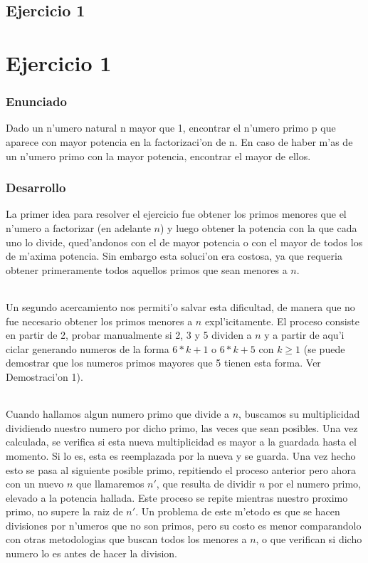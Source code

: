 \chapter{Ejercicio 1}
\part{Ejercicio 1}
\section{Enunciado}
Dado un n'umero natural n mayor que 1, encontrar el n'umero primo p que aparece con mayor potencia en la factorizaci'on de n. En caso de haber m'as de un n'umero primo con  la mayor potencia, encontrar el mayor de ellos.

\section{Desarrollo}
La primer idea para resolver el ejercicio fue obtener los primos menores que el n'umero a factorizar
(en adelante $n$) y luego obtener la potencia con la que cada uno lo divide, qued'andonos con el de mayor
potencia o con el mayor de todos los de m'axima potencia. Sin embargo esta soluci'on era costosa, ya que requeria obtener primeramente todos aquellos primos que sean menores a $n$.
\paragraph{}
Un segundo acercamiento nos permiti'o salvar esta dificultad, de manera que no fue necesario obtener los primos menores a $n$ expl'icitamente. El proceso consiste en partir de 2, probar manualmente si 2, 3 y 5 dividen a $n$ y a partir  de aqu'i ciclar generando numeros de la forma $6*k + 1$ o $6*k + 5$ con $k \geq 1$ (se puede demostrar que los numeros primos mayores que 5 tienen esta forma. Ver Demostraci'on 1).
\paragraph{}
Cuando hallamos algun numero primo que divide a $n$, buscamos su multiplicidad dividiendo nuestro numero por dicho primo, las veces que sean posibles. Una vez calculada, se verifica si esta nueva multiplicidad es mayor a la guardada hasta el momento. Si lo es, esta es reemplazada por la nueva y se guarda. Una vez hecho esto se pasa al siguiente posible primo, repitiendo el proceso anterior pero ahora con un nuevo $n$ que llamaremos $n'$, que resulta de dividir $n$ por el numero primo, elevado a la potencia hallada. Este proceso se repite mientras nuestro proximo primo, no supere la raiz de $n'$. Un problema de este m'etodo es que se hacen divisiones por n'umeros que no son primos, pero su costo es menor comparandolo con otras metodologias que buscan todos los menores a $n$, o que verifican si dicho numero lo es antes de hacer la division.
